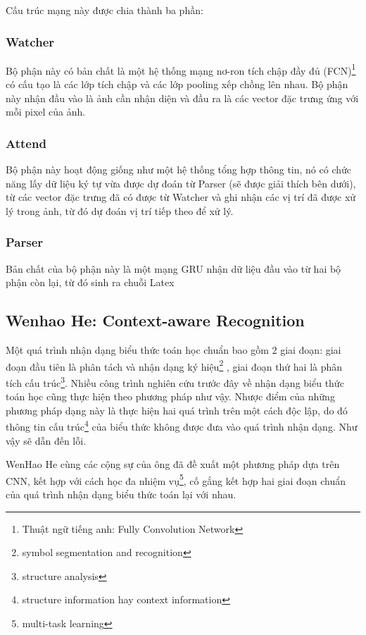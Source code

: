\documentclass[a4paper,12pt]{article}
\begin{document}
	Cấu trúc mạng này được chia thành ba phần:
	\subsubsection{Watcher}
	Bộ phận này có bản chất là một hệ thống mạng nơ-ron tích chập đầy đủ (FCN)\footnote{Thuật ngữ tiếng anh: Fully Convolution Network} có cấu tạo là các lớp tích chập và các lớp pooling xếp chồng lên nhau. Bộ phận này nhận đầu vào là ảnh cần nhận diện và đầu ra là các vector đặc trưng ứng với mỗi pixel của ảnh.
	
	\subsubsection{Attend}
	Bộ phận này hoạt động giống như một hệ thống tổng hợp thông tin, nó có chức năng lấy dữ liệu ký tự vừa được dự đoán từ Parser (sẽ được giải thích bên dưới), từ các vector đặc trưng đã có được từ Watcher và ghi nhận các vị trí đã được xử lý trong ảnh, từ đó dự đoán vị trí tiếp theo để xử lý.
	
	\subsubsection{Parser}
	Bản chất của bộ phận này là một mạng GRU nhận dữ liệu đầu vào từ hai bộ phận còn lại, từ đó sinh ra chuỗi Latex
	
	\subsection{Wenhao He\cite{context}: Context-aware Recognition}
	\label{subsec: context}
	Một quá trình nhận dạng biểu thức toán học chuẩn bao gồm 2 giai đoạn: giai đoạn đầu tiên là phân tách và nhận dạng ký hiệu\footnote{symbol segmentation and recognition} , giai đoạn thứ hai là phân tích cấu trúc\footnote{structure analysis}. Nhiều công trình nghiên cứu trước đây về nhận dạng biểu thức toán học cũng thực hiện theo phương pháp như vậy. Nhược điểm của những phương pháp dạng này là thực hiện hai quá trình trên một cách độc lập, do đó thông tin cấu trúc\footnote{structure information hay context information} của biểu thức không được đưa vào quá trình nhận dạng. Như vậy sẽ dẫn đến lỗi\cite{context}.
	
	WenHao He cùng các cộng sự của ông đã đề xuất một phương pháp dựa trên CNN, kết hợp với cách học đa nhiệm vụ\footnote{multi-task learning}, cố gắng kết hợp hai giai đoạn chuẩn của quá trình nhận dạng biểu thức toán lại với nhau.
	
\end{document}
